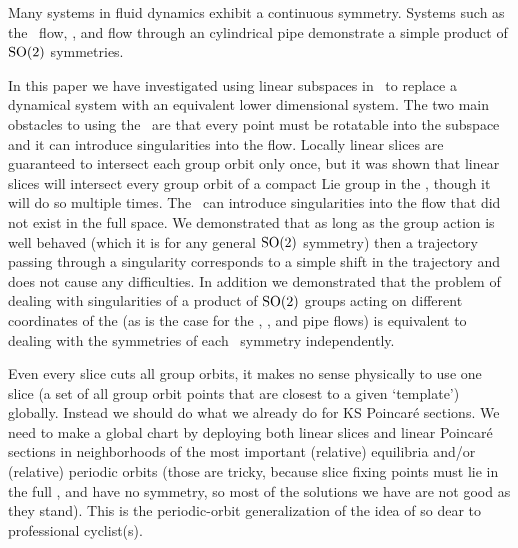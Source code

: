 

Many systems in fluid dynamics exhibit a continuous symmetry. Systems
such as the \KS\ flow,
{\pCf}, and flow through an
cylindrical pipe demonstrate a simple product of
$\textrm{SO}(2)$ symmetries.

In this paper we have investigated using linear subspaces in
\mslices\ to replace a dynamical system with an equivalent
lower dimensional system. The two main obstacles to using the \mslices\
are that every point must be rotatable into the subspace and it can
introduce singularities into the flow. Locally linear slices are
guaranteed to intersect each group orbit only once, but it was shown that
linear slices will intersect every group orbit of a compact Lie group in
the {\statesp}, though it will do so multiple times. The \mslices\ can
introduce singularities into the flow that did not exist in the full
space. We demonstrated that as long as the group action is well behaved
(which it is for any general $\textrm{SO}(2)$ symmetry) then a trajectory
passing through a singularity corresponds to a simple shift in the
trajectory and does not cause any difficulties. In addition we
demonstrated that the problem of dealing with singularities of a product
of $\textrm{SO}(2)$ groups acting on different coordinates of the {\statesp}
(as is the case for the \KS\rf{ku,siv},
{\pCf}, and
pipe flows) is equivalent to dealing with the
symmetries of each \SOn{2}\ symmetry independently.



Even every slice cuts all group orbits, it makes no sense physically to
use one slice
(a set of all group orbit points that are closest to a given `template')
globally. Instead we should do what we already do for KS Poincar\'e sections.
We need to make a global chart by deploying both linear slices and linear
Poincar\'e sections in neighborhoods of the most important (relative)
equilibria and/or (relative) periodic orbits (those are tricky, because
slice fixing points must lie in the full \statesp, and have no symmetry,
so most of the solutions we have are not good as they stand). This is the
periodic-orbit generalization of the idea of
so dear to professional cyclist(s).


